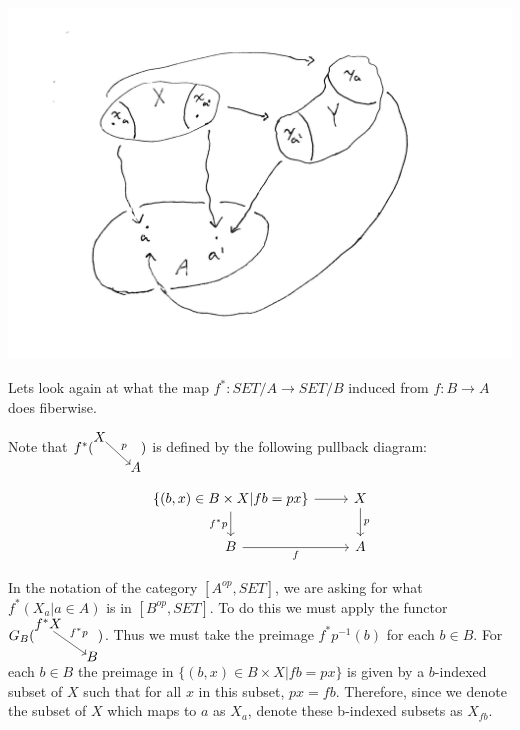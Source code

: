 \documentclass{article}
\theoremstyle{problemstyle}
\theoremstyle{problemstyle}
\theoremstyle{problemstyle}
\theoremstyle{problemstyle}
\theoremstyle{problemstyle}
\theoremstyle{problemstyle}
\theoremstyle{problemstyle}
\theoremstyle{problemstyle}
\begin{document}
\includegraphics[scale=.1]{Figure1_map_over_A}

Lets look again at what the map $f^*: SET/A \rightarrow SET/B$ induced from $f:B \rightarrow A$ does fiberwise. 

Note that $f^*(\begin{tikzcd}[cramped, sep=small] X \arrow[rd, "p", start anchor={[xshift=-.6ex, yshift= .7ex]},end anchor={[xshift=.7ex, yshift= -.7ex]}]  &  \\  &  A \end{tikzcd})$ is defined by the following pullback diagram:

\setcounter{equation}{0}
\begin{equation}
\begin{tikzcd}
\{(b,x)\in B \times X | fb = px\} \arrow[r] \arrow[d,"f^*p"'] & X \arrow[d,"p"]  \\
B  \arrow[r,"f"'] & A 
\end{tikzcd}
\end{equation}

In the notation of the category $[A^{op},SET]$, we are asking for what $f^*(X_a|a \in A)$ is in $[B^{op},SET]$. To do this we must apply the functor $G_B(\begin{tikzcd}[cramped, sep=small] f^*X \arrow[rd, "f^*p", start anchor={[xshift=-1.5ex, yshift= .7ex]},end anchor={[xshift=.7ex, yshift= -.7ex]}, pos = .4]  &  \\  &  B \end{tikzcd})$.  Thus we must take the preimage $f^*p^{-1}(b)$ for each $b \in B$. For each $b \in B$ the preimage in $\{(b,x)\in B \times X | fb = px\}$ is given by a $b$-indexed subset of $X$ such that for all $x$ in this subset, $px = fb$. Therefore, since we denote the subset of $X$ which maps to $a$ as $X_a$, denote these b-indexed subsets as $X_{fb}$.
\end{document}
